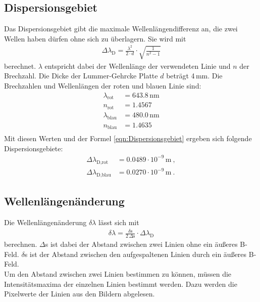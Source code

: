 \subsection{Dispersionsgebiet}
Das Dispersionsgebiet gibt die maximale Wellenlängendifferenz an, die zwei Wellen haben dürfen ohne sich zu überlagern. Sie wird mit
\begin{align}
  \Delta\lambda_\text{D} = \frac{\lambda^2}{2\cdot d} \cdot \sqrt{\frac{1}{n^2 - 1}}
  \label{eqn:Dispersionsgebiet}
\end{align}
berechnet. $\lambda$ entspricht dabei der Wellenlänge der verwendeten Linie und $n$ der Brechzahl. Die Dicke der Lummer-Gehrcke Platte $d$ beträgt 4\,mm. Die Brechzahlen und Wellenlängen der roten und blauen Linie sind:
\begin{align*}
  \lambda_\text{rot} &= 643.8\,\text{nm} \\
  n_\text{rot} &= 1.4567 \\
  \lambda_\text{blau} &= 480.0\,\text{nm} \\
  n_\text{blau} &= 1.4635 \\
\end{align*}
Mit diesen Werten und der Formel \eqref{eqn:Dispersionsgebiet} ergeben sich folgende Dispersionsgebiete:
\begin{align*}
  \Delta\lambda_\text{D,rot} &= 0.0489 \cdot 10^{-9}\,\text{m}\ , \\
  \Delta\lambda_\text{D,blau} &= 0.0270 \cdot 10^{-9}\,\text{m}\ .
\end{align*}



\subsection{Wellenlängenänderung}
Die Wellenlängenänderung $\delta\lambda$ lässt sich mit
\begin{align}
  \delta\lambda = \frac{\delta\text{s}}{2\,\Delta\text{s}}\cdot \Delta\lambda_\text{D}
  \label{eqn:Verschiebung}
\end{align}
berechnen. $\Delta$s ist dabei der Abstand zwischen zwei Linien ohne ein äußeres B-Feld. $\delta$s ist der Abstand zwischen den aufgespaltenen Linien durch ein äußeres B-Feld. \\
Um den Abstand zwischen zwei Linien bestimmen zu können, müssen die Intensitätsmaxima der einzelnen Linien bestimmt werden. Dazu werden die Pixelwerte der Linien aus den Bildern abgelesen.



